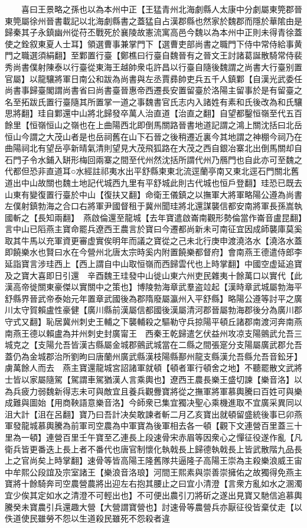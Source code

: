 　　喜曰王景略之孫也以為本州中正【王猛青州北海劇縣人太康中分劇屬東筦郡晉東筦屬徐州晉書載記以北海劇縣書之蓋猛自占漢郡縣也然家於魏郡而隱於華隂由是歸秦其子永鎮幽州從苻丕戰死於襄陵故憲流寓高邑今魏以為本州中正則未得青徐蓋使之銓叙東夏人士耳】領選曹事兼掌門下【選曹吏部尚書之職門下侍中常侍給事黄門之職選須絹翻】至鄴置行臺【鄭樵曰行臺自魏晉有之晉文王討諸葛誕散騎常侍裴秀尚書僕射陳泰以行臺從東海王越帥衆屯許昌以行臺自隨後魏謂之尚書大行臺别置官屬】以龍驤將軍日南公和跋為尚書與左丞賈彞帥吏兵五千人鎮鄴【自漢光武委任尚書事歸臺閣謂尚書省曰尚書臺晉惠帝西遷長安置留臺於洛陽主留事於是有留臺之名至拓跋氏置行臺隨其所置掌一道之事魏書官氏志内入諸姓有素和氏後改為和氏驤思將翻】珪自鄴還中山將北歸發卒萬人治直道【治直之翻】自望都鑿恒嶺至代五百餘里【恒嶺恒山之嶺也在上曲陽西北即倒馬關路晉書地道記謂之鴻上關沈括曰北岳恒山今謂之大茂山者是也岳祠舊在山下石晉之後稍遷近裏今其地謂之神棚今祠乃在曲陽祠北有望岳亭新晴氣清則望見大茂飛狐路在大茂之西自銀冶寨北出倒馬關却自石門子令水鋪入缾形梅回兩寨之間至代州然沈括所謂代州乃鴈門也自此亦可至魏之代都但恐非直道耳○水經註祁夷水出平舒縣柬東北流逕蘭亭南又東北逕石門關北舊道出中山故關也魏土地記代城西九里有平舒城此則古代城也恒戶登翻】珪恐已既去山東有變復置行臺於中山【復扶又翻】命衛王儀鎮之以撫軍大將軍略陽公遵為尚書左僕射鎮勃海之合口右將軍尹國督租于冀州聞珪將北還謀襲信都安南將軍長孫嵩執國斬之【長知兩翻】　燕啟倫還至龍城【去年寶遣啟崙南觀形勢倫當作崙音盧昆翻】言中山已䧟燕主寶命罷兵遼西王農言於寶曰今遷都尚新未可南征宜因成師襲庫莫奚取其牛馬以充軍資更審虚實俟明年而議之寶從之己未北行庚申渡澆洛水【澆洛水蓋即饒樂水也賢曰水在今營州北唐太宗時奚内附置饒樂都督府】會南燕王德遣侍郎李延詣寶言涉珪西上【西上謂自中山取恒嶺而西歸雲代也上時掌翻】中國空虚延追寶及之寶大喜即日引還　辛酉魏王珪發中山徙山東六州吏民雜夷十餘萬口以實代【此漢高帝徙關東豪傑以實關中之策也】博陵勃海章武羣盗竝起【漢時章武城屬勃海平舒縣界晉武帝泰始元年置章武國後為郡隋廢屬瀛州入平舒縣】略陽公遵等討平之廣川太守賀賴盧性豪健【廣川縣前漢屬信都國後漢屬清河郡晉屬勃海郡後分為廣川郡守式又翻】恥居冀州刺史王輔之下襲輔殺之驅勒守兵掠陽平頓丘諸郡南渡河奔南燕南燕王德以賴盧為并州刺史封廣甯王　西秦王乾歸遣乞伏益州攻凉支陽鸇武允吾三城克之【支陽允吾皆漢古縣屬金城郡鸇武城當在二縣之間張寔分支陽屬廣武郡允吾蓋仍為金城郡治所劉昫曰唐蘭州廣武縣漢枝陽縣鄯州龍支縣漢允吾縣允吾音鈆牙】虜萬餘人而去　燕主寶還龍城宮詔諸軍就頓【頓者軍行頓舍之地】不聽罷散文武將士皆以家屬隨駕【駕謂車駕猶漢人言乘輿也】遼西王農長樂王盛切諫【樂音洛】以為兵疲力弱魏新得志未可與敵宜且養兵觀釁寶將從之撫軍將軍慕輿騰曰百姓可與樂成難與圖始【用商鞅語意樂音洛】今師衆已集宜獨决聖心乘機進取不宜廣采異同以沮大計【沮在呂翻】寶乃曰吾計决矣敢諫者斬二月乙亥寶出就頓留盛統後事已卯燕軍發龍城慕輿騰為前軍司空農為中軍寶為後軍相去各一頓【觀下文連營百里蓋三十里為一頓】連營百里壬午寶至乙連長上段速骨宋赤眉等因衆心之憚征役遂作亂【凡衛兵皆更番迭上長上者不番代也唐官制懷化執戟長上歸德執戟長上皆武散階九品長上之官尚矣上時掌翻】速骨等皆高陽王隆舊隊共逼隆子高陽王崇為主殺樂浪威王宙中牟熙公段誼及宗室諸王【樂浪音洛琅】河間王熙素與崇善崇擁佑之故獨得免燕主寶將十餘騎奔司空農營農將出迎左右抱其腰止之曰宜小清澄【言衆方亂如水之溷濁宜少俟其定如水之清澄不可輕出也】不可便出農引刀將斫之遂出見寶又馳信追慕輿騰癸未寶農引兵還趣大營【大營謂寶營也】討速骨等農營兵亦厭征役皆棄仗走【以佚道使民雖勞不怨以生道殺民雖死不怨殺者違